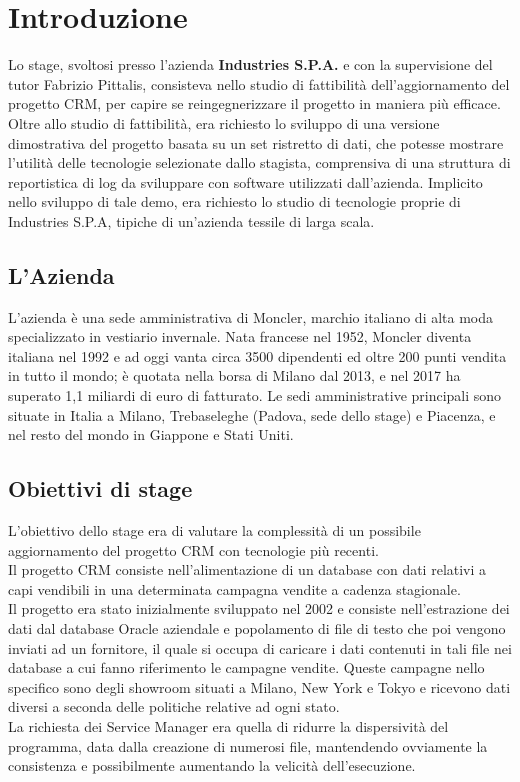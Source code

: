 \pagestyle{fancy}
\fancyhf{}
\fancyhead{}
\fancyhead[RO, LE] {\thepage}
\fancyfoot{}

\section{Introduzione}
Lo stage, svoltosi presso l'azienda \textbf{Industries S.P.A.} e con la supervisione del tutor Fabrizio Pittalis, consisteva nello studio di fattibilità dell'aggiornamento del progetto CRM, per capire se reingegnerizzare il progetto in maniera più efficace.
Oltre allo studio di fattibilità, era richiesto lo sviluppo di una versione dimostrativa del progetto basata su un set ristretto di dati, che potesse mostrare l'utilità delle tecnologie selezionate dallo stagista, comprensiva di una struttura di reportistica di log da sviluppare con software utilizzati dall'azienda.
Implicito nello sviluppo di tale demo, era richiesto lo studio di tecnologie proprie di Industries S.P.A, tipiche di un'azienda tessile di larga scala.

\subsection{L'Azienda}
L'azienda è una sede amministrativa di Moncler, marchio italiano di alta moda specializzato in vestiario invernale.
Nata francese nel 1952, Moncler diventa italiana nel 1992 e ad oggi vanta circa 3500 dipendenti ed oltre 200 punti vendita in tutto il mondo; è quotata nella borsa di Milano dal 2013, e nel 2017 ha superato 1,1 miliardi di euro di fatturato.
Le sedi amministrative principali sono situate in Italia a Milano, Trebaseleghe (Padova, sede dello stage) e Piacenza, e nel resto del mondo in Giappone e Stati Uniti.

\subsection{Obiettivi di stage}
L'obiettivo dello stage era di valutare la complessità di un possibile aggiornamento del progetto CRM con tecnologie più recenti.\\
Il progetto CRM consiste nell'alimentazione di un database con dati relativi a capi vendibili in una determinata campagna vendite a cadenza stagionale.\\
Il progetto era stato inizialmente sviluppato nel 2002 e consiste nell'estrazione dei dati dal database Oracle aziendale e popolamento di file di testo che poi vengono inviati ad un fornitore, il quale si occupa di caricare i dati contenuti in tali file nei database a cui fanno riferimento le campagne vendite. Queste campagne nello specifico sono degli showroom situati a Milano, New York e Tokyo e ricevono dati diversi a seconda delle politiche relative ad ogni stato.\\
La richiesta dei Service Manager era quella di ridurre la dispersività del programma, data dalla creazione di numerosi file, mantendendo ovviamente la consistenza e possibilmente aumentando la velicità dell'esecuzione.

